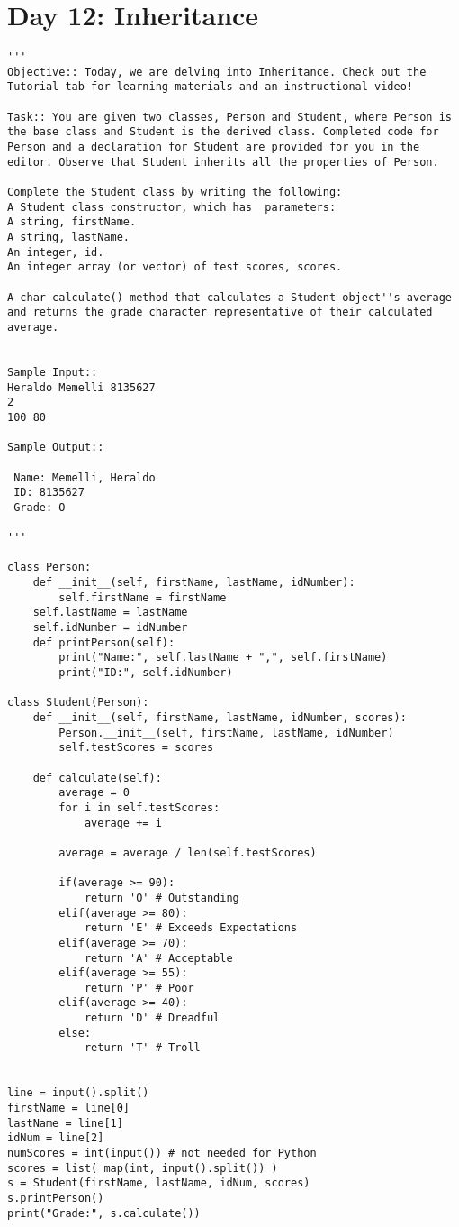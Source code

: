 \documentclass[11pt,a4paper]{article}
\begin{document}
\newpage
\section{Day 12: Inheritance}
\begin{lstlisting}
'''
Objective:: Today, we are delving into Inheritance. Check out the Tutorial tab for learning materials and an instructional video!

Task:: You are given two classes, Person and Student, where Person is the base class and Student is the derived class. Completed code for Person and a declaration for Student are provided for you in the editor. Observe that Student inherits all the properties of Person.

Complete the Student class by writing the following:
A Student class constructor, which has  parameters:
A string, firstName.
A string, lastName.
An integer, id.
An integer array (or vector) of test scores, scores.

A char calculate() method that calculates a Student object''s average and returns the grade character representative of their calculated average. 


Sample Input:: 
Heraldo Memelli 8135627
2
100 80

Sample Output::

 Name: Memelli, Heraldo
 ID: 8135627
 Grade: O

'''

class Person:
    def __init__(self, firstName, lastName, idNumber):
        self.firstName = firstName
	self.lastName = lastName
	self.idNumber = idNumber
    def printPerson(self):
        print("Name:", self.lastName + ",", self.firstName)
        print("ID:", self.idNumber)

class Student(Person):
    def __init__(self, firstName, lastName, idNumber, scores):
        Person.__init__(self, firstName, lastName, idNumber)
        self.testScores = scores
		
    def calculate(self):
        average = 0
        for i in self.testScores:
            average += i

        average = average / len(self.testScores)
		
        if(average >= 90):
            return 'O' # Outstanding
        elif(average >= 80):
            return 'E' # Exceeds Expectations
        elif(average >= 70):
            return 'A' # Acceptable
        elif(average >= 55):
            return 'P' # Poor
        elif(average >= 40):
            return 'D' # Dreadful
        else:
            return 'T' # Troll


line = input().split()
firstName = line[0]
lastName = line[1]
idNum = line[2]
numScores = int(input()) # not needed for Python
scores = list( map(int, input().split()) )
s = Student(firstName, lastName, idNum, scores)
s.printPerson()
print("Grade:", s.calculate())
\end{lstlisting}
\end{document}
